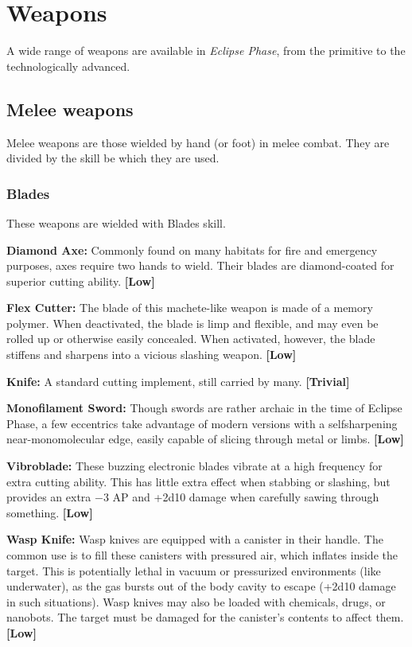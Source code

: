 \section{Weapons} \label{sec:weapons} 

A wide range of weapons are available in \emph{Eclipse Phase}, from the primitive to the technologically advanced. 



\subsection{Melee weapons} \label{sec:melee-weapons} 

Melee weapons are those wielded by hand (or foot) in melee combat. They are divided by the skill be which they are used. 

\subsubsection{Blades} 

These weapons are wielded with Blades skill. 

\textbf{Diamond Axe:} Commonly found on many habitats for fire and emergency purposes, axes require two hands to wield. Their blades are diamond-coated for superior cutting ability. \textbf{[Low]} 

\textbf{Flex Cutter:} The blade of this machete-like weapon is made of a memory polymer. When deactivated, the blade is limp and flexible, and may even be rolled up or otherwise easily concealed. When activated, however, the blade stiffens and sharpens into a vicious slashing weapon. \textbf{[Low]} 

\textbf{Knife:} A standard cutting implement, still carried by many. \textbf{[Trivial]} 

\textbf{Monofilament Sword:} Though swords are rather archaic in the time of Eclipse Phase, a few eccentrics take advantage of modern versions with a selfsharpening near-monomolecular edge, easily capable of slicing through metal or limbs. \textbf{[Low]} 

\textbf{Vibroblade:} These buzzing electronic blades vibrate at a high frequency for extra cutting ability. This has little extra effect when stabbing or slashing, but provides an extra $-$3 AP and +2d10 damage when carefully sawing through something. \textbf{[Low]} 

\textbf{Wasp Knife:} Wasp knives are equipped with a canister in their handle. The common use is to fill these canisters with pressured air, which inflates inside the target. This is potentially lethal in vacuum or pressurized environments (like underwater), as the gas bursts out of the body cavity to escape (+2d10 damage in such situations). Wasp knives may also be loaded with chemicals, drugs, or nanobots. The target must be damaged for the canister’s contents to affect them. \textbf{[Low]} 

